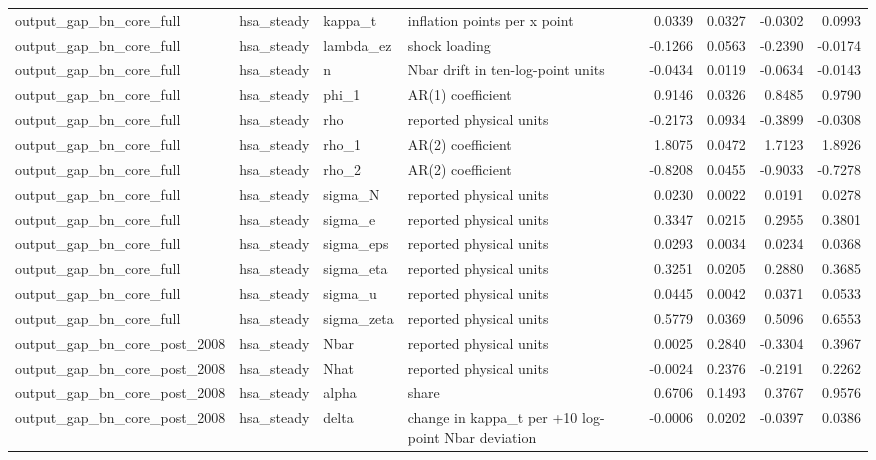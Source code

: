 \begin{tabular}{llllrrrr}
output\_gap\_bn\_core\_full & hsa\_steady & kappa\_t & inflation points per x point & 0.0339 & 0.0327 & -0.0302 & 0.0993 \\
output\_gap\_bn\_core\_full & hsa\_steady & lambda\_ez & shock loading & -0.1266 & 0.0563 & -0.2390 & -0.0174 \\
output\_gap\_bn\_core\_full & hsa\_steady & n & Nbar drift in ten-log-point units & -0.0434 & 0.0119 & -0.0634 & -0.0143 \\
output\_gap\_bn\_core\_full & hsa\_steady & phi\_1 & AR(1) coefficient & 0.9146 & 0.0326 & 0.8485 & 0.9790 \\
output\_gap\_bn\_core\_full & hsa\_steady & rho & reported physical units & -0.2173 & 0.0934 & -0.3899 & -0.0308 \\
output\_gap\_bn\_core\_full & hsa\_steady & rho\_1 & AR(2) coefficient & 1.8075 & 0.0472 & 1.7123 & 1.8926 \\
output\_gap\_bn\_core\_full & hsa\_steady & rho\_2 & AR(2) coefficient & -0.8208 & 0.0455 & -0.9033 & -0.7278 \\
output\_gap\_bn\_core\_full & hsa\_steady & sigma\_N & reported physical units & 0.0230 & 0.0022 & 0.0191 & 0.0278 \\
output\_gap\_bn\_core\_full & hsa\_steady & sigma\_e & reported physical units & 0.3347 & 0.0215 & 0.2955 & 0.3801 \\
output\_gap\_bn\_core\_full & hsa\_steady & sigma\_eps & reported physical units & 0.0293 & 0.0034 & 0.0234 & 0.0368 \\
output\_gap\_bn\_core\_full & hsa\_steady & sigma\_eta & reported physical units & 0.3251 & 0.0205 & 0.2880 & 0.3685 \\
output\_gap\_bn\_core\_full & hsa\_steady & sigma\_u & reported physical units & 0.0445 & 0.0042 & 0.0371 & 0.0533 \\
output\_gap\_bn\_core\_full & hsa\_steady & sigma\_zeta & reported physical units & 0.5779 & 0.0369 & 0.5096 & 0.6553 \\
output\_gap\_bn\_core\_post\_2008 & hsa\_steady & Nbar & reported physical units & 0.0025 & 0.2840 & -0.3304 & 0.3967 \\
output\_gap\_bn\_core\_post\_2008 & hsa\_steady & Nhat & reported physical units & -0.0024 & 0.2376 & -0.2191 & 0.2262 \\
output\_gap\_bn\_core\_post\_2008 & hsa\_steady & alpha & share & 0.6706 & 0.1493 & 0.3767 & 0.9576 \\
output\_gap\_bn\_core\_post\_2008 & hsa\_steady & delta & change in kappa\_t per +10 log-point Nbar deviation & -0.0006 & 0.0202 & -0.0397 & 0.0386 \\

\end{tabular}
